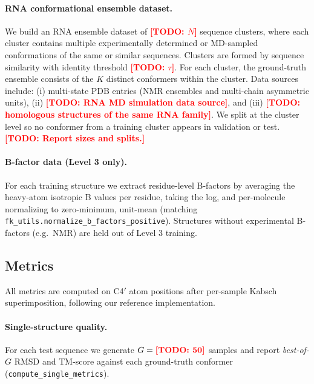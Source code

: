 \documentclass{article}
\theoremstyle{remark}
\theoremstyle{definition}
\newcommand{\todo}[1]{\textcolor{red}{\textbf{[TODO: #1]}}}
\begin{document}
\paragraph{RNA conformational ensemble dataset.}
We build an RNA ensemble dataset of \todo{$N$} sequence clusters, where each
cluster contains multiple experimentally determined or MD-sampled
conformations of the same or similar sequences. Clusters are formed by
sequence similarity with identity threshold \todo{$\tau$}. For each cluster,
the ground-truth ensemble consists of the $K$ distinct conformers within the
cluster. Data sources include: (i) multi-state PDB entries (NMR ensembles and
multi-chain asymmetric units), (ii) \todo{RNA MD simulation data source},
and (iii) \todo{homologous structures of the same RNA family}.
We split at the cluster level so no conformer from a training cluster appears
in validation or test. \todo{Report sizes and splits.}

\paragraph{B-factor data (Level 3 only).}
For each training structure we extract residue-level B-factors by averaging
the heavy-atom isotropic B values per residue, taking the log, and
per-molecule normalizing to zero-minimum, unit-mean (matching
\texttt{fk\_utils.normalize\_b\_factors\_positive}). Structures without
experimental B-factors (e.g.\ NMR) are held out of Level 3 training.

\subsection{Metrics}
\label{subsec:exp-metrics}

All metrics are computed on C4$'$ atom positions after per-sample
Kabsch~\citep{kabsch1976} superimposition, following our reference
implementation.

\paragraph{Single-structure quality.}
For each test sequence we generate $G=\todo{50}$ samples and report
\emph{best-of-$G$} RMSD and TM-score against each ground-truth conformer
(\texttt{compute\_single\_metrics}).
\end{document}
